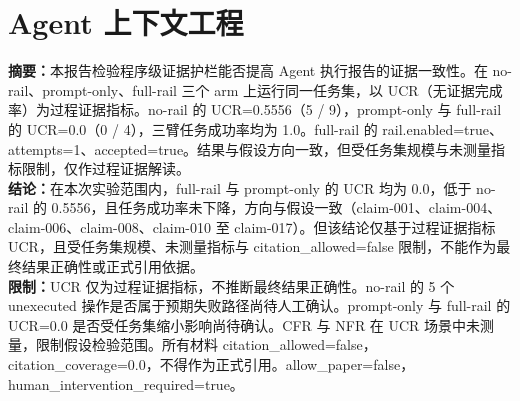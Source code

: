 \documentclass[UTF8]{ctexart}
\begin{document}
\section{Agent 上下文工程}
\textbf{摘要：}本报告检验程序级证据护栏能否提高 Agent 执行报告的证据一致性。在 no-\allowbreak{}rail、prompt-\allowbreak{}only、full-\allowbreak{}rail 三个 arm 上运行同一任务集，以 UCR（无证据完成率）为过程证据指标。no-\allowbreak{}rail 的 UCR=0.5556（5 / 9），prompt-\allowbreak{}only 与 full-\allowbreak{}rail 的 UCR=0.0（0 / 4），三臂任务成功率均为 1.0。full-\allowbreak{}rail 的 rail.enabled=true、attempts=1、accepted=true。结果与假设方向一致，但受任务集规模与未测量指标限制，仅作过程证据解读。\\
\textbf{结论：}在本次实验范围内，full-\allowbreak{}rail 与 prompt-\allowbreak{}only 的 UCR 均为 0.0，低于 no-\allowbreak{}rail 的 0.5556，且任务成功率未下降，方向与假设一致（claim-\allowbreak{}001、claim-\allowbreak{}004、claim-\allowbreak{}006、claim-\allowbreak{}008、claim-\allowbreak{}010 至 claim-\allowbreak{}017）。但该结论仅基于过程证据指标 UCR，且受任务集规模、未测量指标与 citation\_\allowbreak{}allowed=false 限制，不能作为最终结果正确性或正式引用依据。\\
\textbf{限制：}UCR 仅为过程证据指标，不推断最终结果正确性。no-\allowbreak{}rail 的 5 个 unexecuted 操作是否属于预期失败路径尚待人工确认。prompt-\allowbreak{}only 与 full-\allowbreak{}rail 的 UCR=0.0 是否受任务集缩小影响尚待确认。CFR 与 NFR 在 UCR 场景中未测量，限制假设检验范围。所有材料 citation\_\allowbreak{}allowed=false，citation\_\allowbreak{}coverage=0.0，不得作为正式引用。allow\_\allowbreak{}paper=false，human\_\allowbreak{}intervention\_\allowbreak{}required=true。
\end{document}
